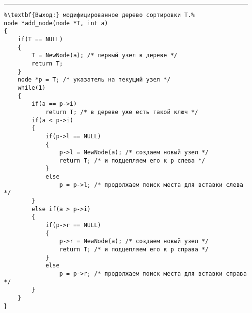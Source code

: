 \documentclass{article}
\begin{document}
\vspace{5pt} \hrule
\begin{lstlisting}[caption={Вставка узла в дерево сортировки}, label=p317, escapechar=\%]
%\noindent\textbf{Вход:} дерево сортировки T, заданное указателем на корень; ключ a: key.\\%
%\textbf{Выход:} модифицированное дерево сортировки T.%
node *add_node(node *T, int a)
{
	if(T == NULL)
	{
		T = NewNode(a); /* первый узел в дереве */
		return T;
	}
	node *p = T; /* указатель на текущий узел */
	while(1)
	{
		if(a == p->i)
			return T; /* в дереве уже есть такой ключ */
		if(a < p->i)
		{
			if(p->l == NULL)
			{
				p->l = NewNode(a); /* создаем новый узел */
				return T; /* и подцепляем его к p слева */
			}
			else
				p = p->l; /* продолжаем поиск места для вставки слева */
		}
		else if(a > p->i)
		{
			if(p->r == NULL)
			{
				p->r = NewNode(a); /* создаем новый узел */
				return T; /* и подцепляем его к p справа */
			}
			else
				p = p->r; /* продолжаем поиск места для вставки справа */
		}
	}
}
\end{lstlisting}
\end{document}
